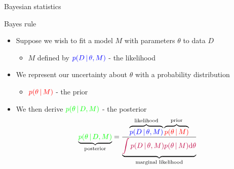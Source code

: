 \begin{frame}{Bayesian statistics}
  \begin{itemize}
  \end{itemize}
\end{frame}

\begin{frame}{Bayes rule}
  \begin{itemize}
      \item Suppose we wish to fit a model $M$ with parameters $\theta$ to data $D$
      \begin{itemize}
        \item $M$ defined by $\textcolor{blue}{p(D\,|\,\theta,M)}$ - the likelihood
      \end{itemize}
      \vspace{\baselineskip}
      \item We represent our uncertainty about $\theta$ with a probability distribution
      \begin{itemize}
        \item $\textcolor{red}{p(\theta\,|\,M)}$ - the prior
      \end{itemize}
      \vspace{\baselineskip}
      \item We then derive $\textcolor{green}{p(\theta\,|\,D,M)}$ - the posterior
      \begin{equation*}
       \underbrace{\textcolor{green}{p(\theta \,|\, D, M)}}_{\textnormal{posterior}} = \frac{\overbrace{\textcolor{blue}{p(D \,|\, \theta, M)}}^{\textnormal{likelihood}}\overbrace{\textcolor{red}{p(\theta \,|\, M)}}^{\textnormal{prior}}}{\underbrace{\textcolor{purple}{\int p(D \,|\, \theta, M)p(\theta \,|\, M)\textrm{d}\theta}}_{\textnormal{marginal likelihood}}}
      \end{equation*}
  \end{itemize}
\end{frame}

